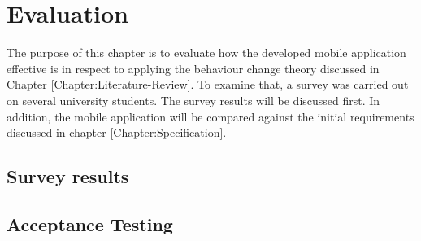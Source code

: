 \chapter{Evaluation}
The purpose of this chapter is to evaluate how the developed mobile application effective is in respect to applying the behaviour change theory discussed in Chapter \ref{Chapter:Literature-Review}. To examine that, a survey was carried out on several university students. The survey results will be discussed first. In addition, the mobile application will be compared against the initial requirements discussed in chapter  \ref{Chapter:Specification}.


\section{Survey results}

\section{Acceptance Testing}